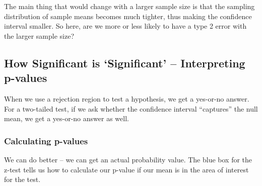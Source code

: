 \documentclass[
  letterpaper,
  DIV=11,
  numbers=noendperiod]{scrreprt}
\begin{document}
The main thing that would change with a larger sample size is that the
sampling distribution of sample means becomes much tighter, thus making
the confidence interval smaller. So here, are we more or less likely to
have a type 2 error with the larger sample size?

\begin{figure}


\caption{\label{fig-5-5.type_2_samplesize_larger}}

\end{figure}%

\subsection{How Significant is `Significant' -- Interpreting
p-values}\label{how-significant-is-significant-interpreting-p-values}

When we use a rejection region to test a hypothesis, we get a yes-or-no
answer. For a two-tailed test, if we ask whether the confidence interval
``captures'' the null mean, we get a yes-or-no answer as well.

\subsubsection{Calculating p-values}\label{calculating-p-values}

We can do better -- we can get an actual probability value. The blue box
for the z-test tells us how to calculate our p-value if our mean is in
the area of interest for the test.
\end{document}
